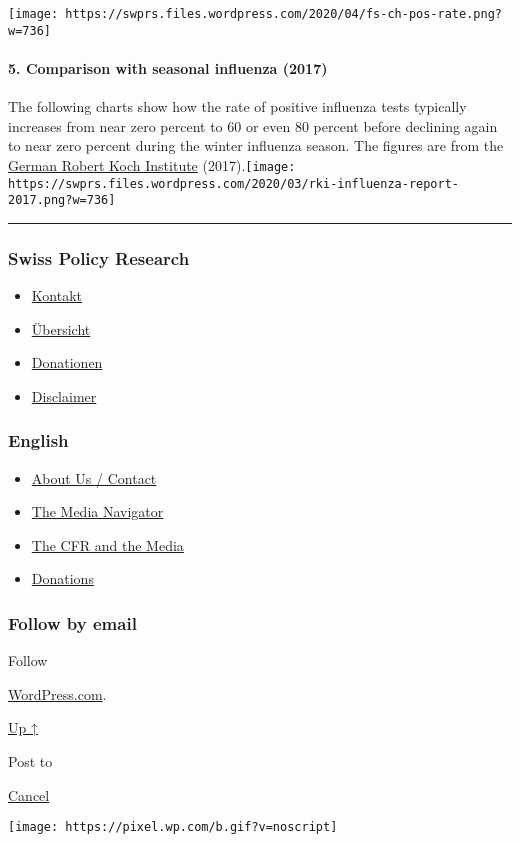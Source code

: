 \texttt{[image: https://swprs.files.wordpress.com/2020/04/fs-ch-pos-rate.png?w=736]}

\hypertarget{5-comparison-with-seasonal-influenza-2017}{%
\paragraph{5. Comparison with seasonal influenza
(2017)}\label{5-comparison-with-seasonal-influenza-2017}}

The following charts show how the rate of positive influenza tests
typically increases from near zero percent to 60 or even 80 percent
before declining again to near zero percent during the winter influenza
season. The figures are from the
\href{https://influenza.rki.de/Saisonberichte/2017.pdf\#page=31}{German
Robert Koch Institute}
(2017).\texttt{[image: https://swprs.files.wordpress.com/2020/03/rki-influenza-report-2017.png?w=736]}

\begin{center}\rule{0.5\linewidth}{\linethickness}\end{center}

\hypertarget{swiss-policy-research}{%
\subsubsection{Swiss Policy Research}\label{swiss-policy-research}}

\begin{itemize}
\tightlist
\item
  \href{https://swprs.org/kontakt/}{Kontakt}
\item
  \href{https://swprs.org/uebersicht/}{Übersicht}
\item
  \href{https://swprs.org/donationen/}{Donationen}
\item
  \href{https://swprs.org/disclaimer/}{Disclaimer}
\end{itemize}

\hypertarget{english}{%
\subsubsection{English}\label{english}}

\begin{itemize}
\tightlist
\item
  \href{https://swprs.org/contact/}{About Us / Contact}
\item
  \href{https://swprs.org/media-navigator/}{The Media Navigator}
\item
  \href{https://swprs.org/the-american-empire-and-its-media/}{The CFR
  and the Media}
\item
  \href{https://swprs.org/donations/}{Donations}
\end{itemize}

\hypertarget{follow-by-email}{%
\subsubsection{Follow by email}\label{follow-by-email}}

Follow

\href{https://wordpress.com/?ref=footer_custom_com}{WordPress.com}.

\protect\hyperlink{}{Up ↑}

Post to

\protect\hyperlink{}{Cancel}

\texttt{[image: https://pixel.wp.com/b.gif?v=noscript]}
